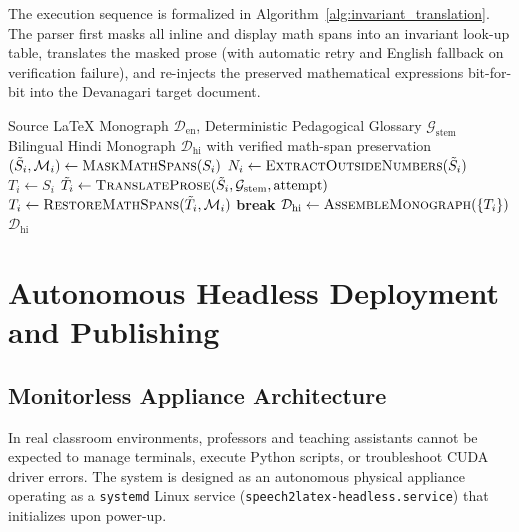 \documentclass[11pt,a4paper,oneside]{report}
\begin{document}
The execution sequence is formalized in Algorithm~\ref{alg:invariant_translation}. The parser first masks all inline and display math spans into an invariant look-up table, translates the masked prose (with automatic retry and English fallback on verification failure), and re-injects the preserved mathematical expressions bit-for-bit into the Devanagari target document.

\begin{algorithm}[H]
\caption{Mathematical Invariant Masking and Bilingual Monograph Synthesis}
\label{alg:invariant_translation}
\begin{algorithmic}[1]
\Require Source LaTeX Monograph $\mathcal{D}_{\text{en}}$, Deterministic Pedagogical Glossary $\mathcal{G}_{\text{stem}}$
\Ensure Bilingual Hindi Monograph $\mathcal{D}_{\text{hi}}$ with verified math-span preservation
    \State $(\tilde{S}_i, \mathcal{M}_i) \gets \Call{MaskMathSpans}{S_i}$ 
    \State $N_i \gets \Call{ExtractOutsideNumbers}{\tilde{S}_i}$
    \State $T_i \gets S_i$ 
        \State $\tilde{T}_i \gets \Call{TranslateProse}{\tilde{S}_i, \mathcal{G}_{\text{stem}}, \text{attempt}}$
            \State $T_i \gets \Call{RestoreMathSpans}{\tilde{T}_i, \mathcal{M}_i}$
            \State \textbf{break}
        \EndIf
    \EndFor
\EndFor
\State $\mathcal{D}_{\text{hi}} \gets \Call{AssembleMonograph}{\{T_i\}}$
\State \Return $\mathcal{D}_{\text{hi}}$
\end{algorithmic}
\end{algorithm}

\chapter{Autonomous Headless Deployment and Publishing}
\label{chap:deployment}

\section{Monitorless Appliance Architecture}
In real classroom environments, professors and teaching assistants cannot be expected to manage terminals, execute Python scripts, or troubleshoot CUDA driver errors. The system is designed as an autonomous physical appliance operating as a \texttt{systemd} Linux service (\texttt{speech2latex-headless.service}) that initializes upon power-up.
\end{document}
